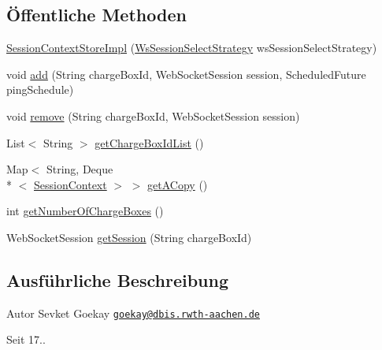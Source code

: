 \subsection*{Öffentliche Methoden}
\begin{DoxyCompactItemize}
\item 
\hyperlink{classde_1_1rwth_1_1idsg_1_1steve_1_1ocpp_1_1ws_1_1_session_context_store_impl_a2430b711af31c8bc15fc5597a87417dc}{Session\-Context\-Store\-Impl} (\hyperlink{interfacede_1_1rwth_1_1idsg_1_1steve_1_1ocpp_1_1ws_1_1custom_1_1_ws_session_select_strategy}{Ws\-Session\-Select\-Strategy} ws\-Session\-Select\-Strategy)
\item 
void \hyperlink{classde_1_1rwth_1_1idsg_1_1steve_1_1ocpp_1_1ws_1_1_session_context_store_impl_a2225d8697d71978cac5ecf1962d76d72}{add} (String charge\-Box\-Id, Web\-Socket\-Session session, Scheduled\-Future ping\-Schedule)
\item 
void \hyperlink{classde_1_1rwth_1_1idsg_1_1steve_1_1ocpp_1_1ws_1_1_session_context_store_impl_a1d7770d143641dbfccf297b03f6f23fc}{remove} (String charge\-Box\-Id, Web\-Socket\-Session session)
\item 
List$<$ String $>$ \hyperlink{classde_1_1rwth_1_1idsg_1_1steve_1_1ocpp_1_1ws_1_1_session_context_store_impl_a04306c85b200069137e828a1d6db8560}{get\-Charge\-Box\-Id\-List} ()
\item 
Map$<$ String, Deque\\*
$<$ \hyperlink{classde_1_1rwth_1_1idsg_1_1steve_1_1ocpp_1_1ws_1_1data_1_1_session_context}{Session\-Context} $>$ $>$ \hyperlink{classde_1_1rwth_1_1idsg_1_1steve_1_1ocpp_1_1ws_1_1_session_context_store_impl_ac17f07b4be357aec023b01f6298a3dc3}{get\-A\-Copy} ()
\item 
int \hyperlink{classde_1_1rwth_1_1idsg_1_1steve_1_1ocpp_1_1ws_1_1_session_context_store_impl_ab364234851cdf7f0721154e5986f77b9}{get\-Number\-Of\-Charge\-Boxes} ()
\item 
Web\-Socket\-Session \hyperlink{classde_1_1rwth_1_1idsg_1_1steve_1_1ocpp_1_1ws_1_1_session_context_store_impl_a81bf3419fb5de7a16bff8a6adc5546ee}{get\-Session} (String charge\-Box\-Id)
\end{DoxyCompactItemize}


\subsection{Ausführliche Beschreibung}
\begin{DoxyAuthor}{Autor}
Sevket Goekay \href{mailto:goekay@dbis.rwth-aachen.de}{\tt goekay@dbis.\-rwth-\/aachen.\-de} 
\end{DoxyAuthor}
\begin{DoxySince}{Seit}
17.. 
\end{DoxySince}


